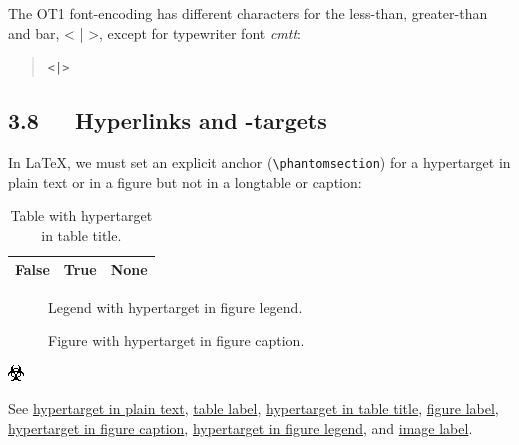 \documentclass[a4paper]{article}
\newlength{\DUtablewidth} %
\newenvironment{DUlegend}{\small}{}
\providecommand*{\DUroletitlereference}[1]{\textsl{#1}}
\begin{document}
The OT1 font-encoding has different characters for the less-than,
greater-than and bar, < | >, except for typewriter font \DUroletitlereference{cmtt}:

\begin{quote}
\begin{alltt}
< | >
\end{alltt}
\end{quote}


\subsection{3.8   Hyperlinks and -targets%
  \label{hyperlinks-and-targets}%
}

In LaTeX, we must set an explicit anchor (\texttt{\textbackslash{}phantomsection}) for a
%
\label{hypertarget-in-plain-text}hypertarget in plain text or in a figure but not in a longtable or
caption:

\setlength{\DUtablewidth}{\linewidth}
\begin{longtable}[c]{|p{0.075\DUtablewidth}|p{0.075\DUtablewidth}|p{0.075\DUtablewidth}|}
\caption{Table with %
\label{hypertarget-in-table-title}hypertarget in table title.}\\
\hline

False
 & 
True
 & 
None
 \\
\hline
\end{longtable}
\label{table-label}

\begin{figure}
\label{figure-label}
\noindent{}
\caption{Figure with %
\label{hypertarget-in-figure-caption}hypertarget in figure caption.}
\begin{DUlegend}
Legend with %
\label{hypertarget-in-figure-legend}hypertarget in figure legend.
\end{DUlegend}
\end{figure}

\includegraphics{../../../docs/user/rst/images/biohazard.png}
\label{image-label}

See \hyperref[hypertarget-in-plain-text]{hypertarget in plain text},
\hyperref[table-label]{table label}, \hyperref[hypertarget-in-table-title]{hypertarget in table title},
\hyperref[figure-label]{figure label}, \hyperref[hypertarget-in-figure-caption]{hypertarget in figure caption},
\hyperref[hypertarget-in-figure-legend]{hypertarget in figure legend}, and
\hyperref[image-label]{image label}.
\end{document}
